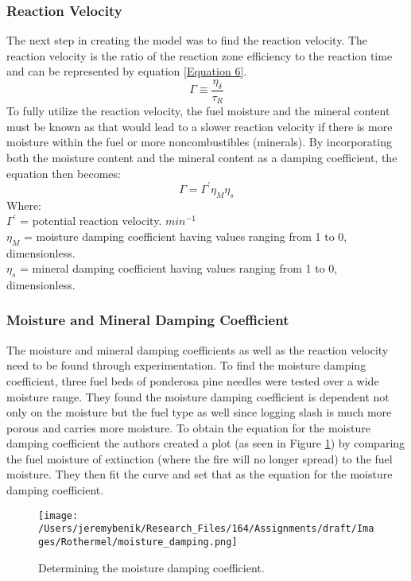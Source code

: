\documentclass{article}
\begin{document}
\subsubsection{Reaction Velocity}
\indent The next step in creating the model was to find the reaction velocity. The reaction velocity is the ratio of the reaction zone efficiency to the reaction time and can be represented by equation \ref{Equation 6}.
\begin{equation}
	\label{Equation 6}
	\Gamma \equiv \frac {\eta _ \delta} {\tau _ R}
\end{equation}
\indent To fully utilize the reaction velocity, the fuel moisture and the mineral content must be known as that would lead to a slower reaction velocity if there is more moisture within the fuel or more noncombustibles (minerals). By incorporating both the moisture content and the mineral content as a damping coefficient, the equation then becomes: 
\begin{equation}
	\label{Equation 7}
	\Gamma = \Gamma ^ {'} \eta _ M \eta _ s
\end{equation}
Where: \\
 $\Gamma ^ {'}$ = potential reaction velocity. $min ^ {-1}$ \\ 
 $\eta _ M$ = moisture damping coefficient having values ranging from 1 to 0, dimensionless. \\
 $\eta _ s$ = mineral damping coefficient having values ranging from 1 to 0, dimensionless. \\
 \subsubsection{Moisture and Mineral Damping Coefficient}
\indent The moisture and mineral damping coefficients as well as the reaction velocity need to be found through experimentation. To find the moisture damping coefficient, three fuel beds of ponderosa pine needles were tested over a wide moisture range. They found the moisture damping coefficient is dependent not only on the moisture but the fuel type as well since logging slash is much more porous and carries more moisture. To obtain the equation for the moisture damping coefficient the authors created a plot (as seen in Figure \ref{rothermel_moistures_damping}) by comparing the fuel moisture of extinction (where the fire will no longer spread) to the fuel moisture. They then fit the curve and set that as the equation for the moisture damping coefficient. 
 \begin{figure}[h]
 \centering
  \texttt{[image: /Users/jeremybenik/Research\_Files/164/Assignments/draft/Images/Rothermel/moisture\_damping.png]}
  \caption{Determining the moisture damping coefficient.}
  \label{rothermel_moistures_damping}
\end{figure}
\end{document}
